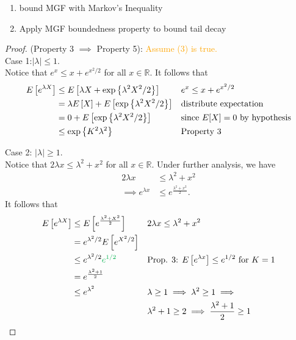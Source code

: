 \begin{tcolorbox}[colback=white!90!gray, title=Proof Technique: Bounding Tail Decay]
\begin{enumerate}
    \item bound MGF with Markov's Inequality
    \item Apply MGF boundedness property to bound tail decay
\end{enumerate}
\end{tcolorbox}


\begin{proof}
(Property 3 $\implies$ Property 5): \textcolor{orange}{Assume (3) is true.}  \\ 


\noindent Case 1:$|\lambda| \leq 1$. \\
\noindent Notice that \textcolor{\lblue}{$e^x \leq x + e^{x^2/2}$ for all $x \in \mathbb{R}$}. It follows that 
\begin{align*}
    E\left[e^{\lambda X} \right] &\leq E\left[\lambda X + \exp\left\{\lambda^2 X^2 / 2 \right\} \right] &&
        \text{$e^x \leq x + e^{x^2/2}$} \\ 
    &= \lambda E\left[X \right] + E\left[\exp\left\{\lambda^2 X^2 /2  \right\} \right] && 
        \text{distribute expectation} \\ 
    &= 0 + E\left[\exp\left\{\lambda^2 X^2 /2  \right\} \right] && 
        \text{since $E[X] = 0$ by hypothesis} \\ 
    &\leq \exp\left\{K^2 \lambda^2 \right\} && 
        \text{Property 3}
\end{align*}

\noindent Case 2: $|\lambda| \geq 1$.  \\
\noindent Notice that \textcolor{\lblue}{$2\lambda x \leq \lambda^2 + x^2$ for all $x \in \mathbb{R}$}. Under further analysis, we have 
\begin{align*}
2\lambda x &\leq \lambda^2 + x^2  \\
\implies e^{\lambda x} &\leq e^{\frac{\lambda^2 + x^2}{2}}. 
\end{align*}
It follows that 
\begin{align*}
    \Expect{e^{\lambda X}} &\leq \Expect{e^{\frac{\lambda^2+X^2}{2}}} && 
        \text{$2\lambda x \leq \lambda^2 + x^2$} \\ 
    &= e^{\lambda^2/2} \Expect{e^{X^2/2}} \\ 
    &\leq e^{\lambda^2/2} \textcolor{\dgreen}{e^{1/2}} &&\text{Prop. 3: $\Expect{e^{\lambda x}} \leq e^{1/2}$ for $K=1$} \\ 
    &= e^{\frac{\lambda^2+1}{2}} && \text{} \\ 
    &\leq e^{\lambda^2} && \text{$\lambda \geq 1 \implies \lambda^2 \geq 1 \implies$} \\ 
    & && \text{$\lambda^2+1 \geq 2 \implies  \frac{\lambda^2+1}{2} \geq 1$}
\end{align*}
\end{proof}

